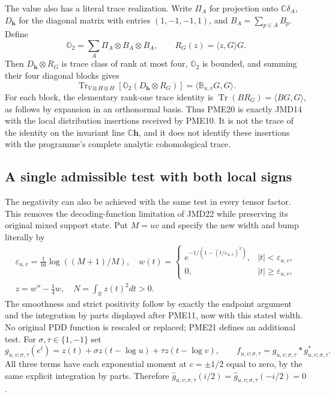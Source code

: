 \documentclass[11pt]{article}
\begin{document}
The value also has a literal trace realization. Write $\Pi_A$ for
projection onto $\mathbb C\delta_A$, $D_{\mathbf h}$ for the
diagonal matrix with entries $(1,-1,-1,1)$, and
$B_A=\sum_{p\in A}B_p$. Define
\[
 \mathbb O_2=\sum_A\Pi_A\otimes B_A\otimes B_A,
 \qquad R_G(z)=\langle z,G\rangle G.
 \tag{PME19}
\]
Then $D_{\mathbf h}\otimes R_G$ is trace class of rank at most four,
$\mathbb O_2$ is bounded, and summing their four diagonal blocks gives
\[
 \operatorname{Tr}_{V\otimes H\otimes H}
 [\mathbb O_2(D_{\mathbf h}\otimes R_G)]
 =\langle\mathbb B_{u,v}G,G\rangle.
 \tag{PME20}
\]
For each block, the elementary rank-one trace identity is
$\operatorname{Tr}(BR_G)=\langle BG,G\rangle$, as follows by
expansion in an orthonormal basis. Thus PME20 is exactly JMD14
with the local distribution insertions received by PME10.
It is not the trace of the identity on the invariant line
$\mathbb C\mathbf h$, and it does not identify these insertions
with the programme's complete analytic cohomological trace.

\subsection{A single admissible test with both local signs}

The negativity can also be achieved with the same test in every
tensor factor. This removes the decoding-function limitation of
JMD22 while preserving its original mixed support state.
Put $M=uv$ and specify the new width and bump literally by
\[
 \begin{gathered}
 \varepsilon_{u,v}=\tfrac1{16}\log((M+1)/M),\quad
 w(t)=\begin{cases}e^{-1/(1-(t/\varepsilon_{u,v})^2)},
                &|t|<\varepsilon_{u,v},\\0,&|t|\ge\varepsilon_{u,v},
          \end{cases}\\
 z=w''-\tfrac14w,\quad N=\int_{\mathbb R}z(t)^2dt>0.
 \end{gathered}
 \tag{PME21}
\]
The smoothness and strict positivity follow by exactly the endpoint
argument and the integration by parts displayed after PME11, now
with this stated width. No original PDD function is rescaled or
replaced; PME21 defines an additional test. For
$\sigma,\tau\in\{1,-1\}$ set
\[
 g_{u,v;\sigma,\tau}(e^t)
    =z(t)+\sigma z(t-\log u)+\tau z(t-\log v),\qquad
 f_{u,v;\sigma,\tau}=g_{u,v;\sigma,\tau}
                         *g_{u,v;\sigma,\tau}^*.
 \tag{PME22}
\]
All three terms have each exponential moment at $c=\pm1/2$ equal
to zero, by the same explicit integration by parts. Therefore
$\widehat g_{u,v;\sigma,\tau}(i/2)
=\widehat g_{u,v;\sigma,\tau}(-i/2)=0$.
\end{document}
